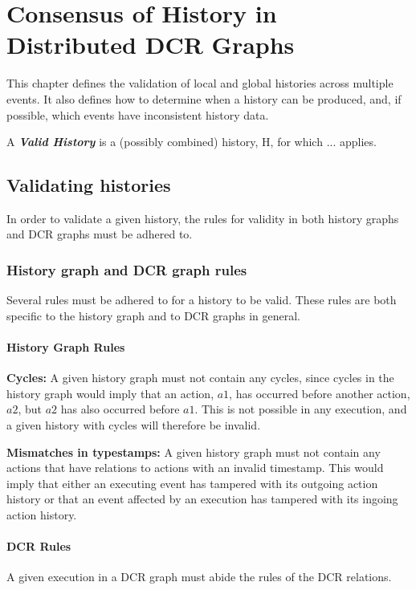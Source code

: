 \chapter{Consensus of History in Distributed DCR Graphs}
\label{chap:consensusindcr}
	This chapter defines the validation of local and global histories across multiple events. It also defines how to determine when a history can be produced, and, if possible, which events have inconsistent history data.
	 
	\begin{definition}
		A \textit{\textbf{Valid History}} is a (possibly combined) history, H, for which ... applies. 
	\end{definition}
	
	\section{Validating histories}
	In order to validate a given history, the rules for validity in both history graphs and DCR graphs must be adhered to. 
	
	\subsection{History graph and DCR graph rules}
	Several rules must be adhered to for a history to be valid. These rules are both specific to the history graph and to DCR graphs in general. 
	
	\subsubsection{History Graph Rules}
	\textbf{Cycles:} A given history graph must not contain any cycles, since cycles in the history graph would imply that an action, $a1$, has occurred before another action, $a2$, but $a2$ has also occurred before $a1$. This is not possible in any execution, and a given history with cycles will therefore be invalid.
	
	\newpar \textbf{Mismatches in typestamps:} A given history graph must not contain any actions that have relations to actions with an invalid timestamp. This would imply that either an executing event has tampered with its outgoing action history or that an event affected by an execution has tampered with its ingoing action history. 
	
	
	\subsubsection{DCR Rules}
	A given execution in a DCR graph must abide the rules of the DCR relations. 
	
